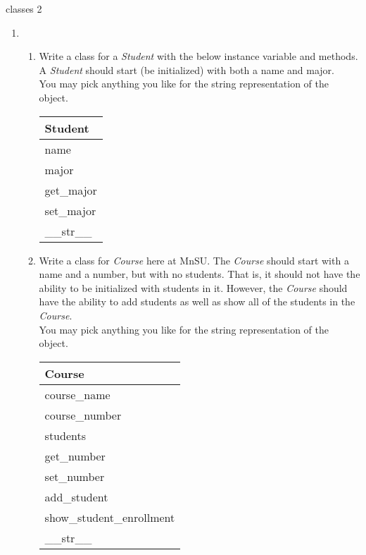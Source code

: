 \documentclass{article}
\begin{document}
\begin{flushright}
classes 2\end{flushright}

\vspace*{-1.5em}
\noindent\makebox[\linewidth]{\rule{\paperwidth}{0.4pt}}


\vspace*{2em}

\begin{enumerate}




	\item 
	\begin{enumerate}
		\item 
			Write a class for a \textit{Student} with the below instance variable and methods.\\
			A \textit{Student} should start (be initialized) with both a name and major.\\
			You may pick anything you like for the string representation of the object.
			\begin{flushright}
			\begin{tabular}{|l|} \hline
				Student\\ \hline
				name\\ major\\ \hline
				get\_major\\ set\_major\\ \_\_str\_\_ \\ \hline
			\end{tabular}
			\end{flushright}
		
		\item 
			Write a class for \textit{Course} here at MnSU.  The \textit{Course} should start 
			with a name and a number, but with no students. That is, it should 
			not have the ability to be initialized with students in it. However, the 
			\textit{Course} should have the ability to add students as well as show all of the
			students in the \textit{Course}.\\
			You may pick anything you like for the string representation of the object.
			\begin{flushright}
			\begin{tabular}{|l|} \hline 
				Course\\ \hline
				course\_name\\ course\_number\\ students\\ \hline
				get\_number\\ set\_number\\ add\_student\\ show\_student\_enrollment\\ 
					\_\_str\_\_ \\ \hline
			\end{tabular}
			\end{flushright}


\end{enumerate}
\end{enumerate}
\end{document}
